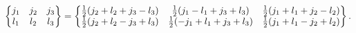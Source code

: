\[\begin{Bmatrix}j_{1}&j_{2}&j_{3}\\
l_{1}&l_{2}&l_{3}\end{Bmatrix}=\begin{Bmatrix}\frac{1}{2}(j_{2}+l_{2}+j_{3}-l_%
{3})&\frac{1}{2}(j_{1}-l_{1}+j_{3}+l_{3})&\frac{1}{2}(j_{1}+l_{1}+j_{2}-l_{2})%
\\
\frac{1}{2}(j_{2}+l_{2}-j_{3}+l_{3})&\frac{1}{2}(-j_{1}+l_{1}+j_{3}+l_{3})&%
\frac{1}{2}(j_{1}+l_{1}-j_{2}+l_{2})\end{Bmatrix}.\]